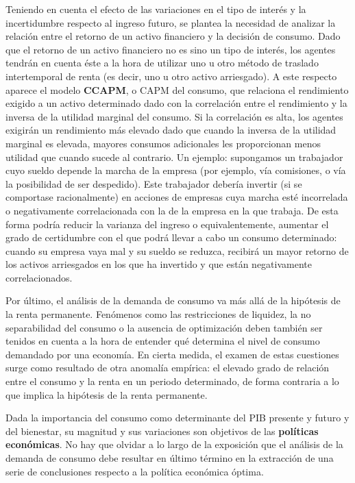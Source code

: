 \documentclass{nuevotema}
\begin{document}
Teniendo en cuenta el efecto de las variaciones en el tipo de interés y la incertidumbre respecto al ingreso futuro, se plantea la necesidad de analizar la relación entre el retorno de un activo financiero y la decisión de consumo. Dado que el retorno de un activo financiero no es sino un tipo de interés, los agentes tendrán en cuenta éste a la hora de utilizar uno u otro método de traslado intertemporal de renta (es decir, uno u otro activo arriesgado). A este respecto aparece el modelo \textbf{CCAPM}, o CAPM del consumo, que relaciona el rendimiento exigido a un activo determinado dado con la correlación entre el rendimiento y la inversa de la utilidad marginal del consumo. Si la correlación es alta, los agentes exigirán un rendimiento más elevado dado que cuando la inversa de la utilidad marginal es elevada, mayores consumos adicionales les proporcionan menos utilidad que cuando sucede al contrario. Un ejemplo: supongamos un trabajador cuyo sueldo depende la marcha de la empresa (por ejemplo, vía comisiones, o vía la posibilidad de ser despedido). Este trabajador debería invertir (si se comportase racionalmente) en acciones de empresas cuya marcha esté incorrelada o negativamente correlacionada con la de la empresa en la que trabaja. De esta forma podría reducir la varianza del ingreso o equivalentemente, aumentar el grado de certidumbre con el que podrá llevar a cabo un consumo determinado: cuando su empresa vaya mal y su sueldo se reduzca, recibirá un mayor retorno de los activos arriesgados en los que ha invertido y que están negativamente correlacionados.

Por último, el análisis de la demanda de consumo va más allá de la hipótesis de la renta permanente. Fenómenos como las restricciones de liquidez, la no separabilidad del consumo o la ausencia de optimización deben también ser tenidos en cuenta a la hora de entender qué determina el nivel de consumo demandado por una economía. En cierta medida, el examen de estas cuestiones surge como resultado de otra anomalía empírica: el elevado grado de relación entre el consumo y la renta en un periodo determinado, de forma contraria a lo que implica la hipótesis de la renta permanente.

Dada la importancia del consumo como determinante del PIB presente y futuro y del bienestar, su magnitud y sus variaciones son objetivos de las \textbf{políticas económicas}. No hay que olvidar a lo largo de la exposición que el análisis de la demanda de consumo debe resultar en último término en la extracción de una serie de conclusiones respecto a la política económica óptima.
\end{document}
